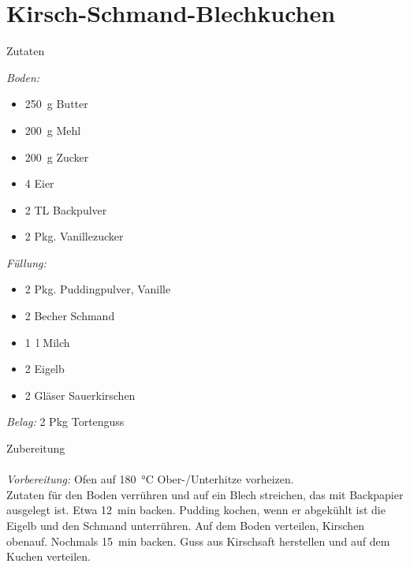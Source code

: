 \section*{Kirsch-Schmand-Blechkuchen}
\ihead{}\ohead{}
\cfoot{}
{\Large Zutaten}
\begin{multicols}{2}
\textit{Boden:}
\begin{itemize}
    \item \SI{250}{g} Butter
    \item \SI{200}{g} Mehl
    \item \SI{200}{g} Zucker
    \item \num{4} Eier
    \item \num{2} TL Backpulver
    \item \num{2} Pkg. Vanillezucker
\end{itemize}
\textit{Füllung:}
\begin{itemize}
    \item \num{2} Pkg. Puddingpulver, Vanille
    \item \num{2} Becher Schmand
    \item \SI{1}{l} Milch
    \item \num{2} Eigelb
    \item \num{2} Gläser Sauerkirschen
\end{itemize}
\textit{Belag:} \num{2} Pkg Tortenguss
\end{multicols}
\noindent
{\Large Zubereitung}\\
\\
\textit{Vorbereitung:} Ofen auf \SI{180}{\celsius} Ober-/Unterhitze vorheizen.\\
Zutaten für den Boden verrühren und auf ein Blech streichen, das mit Backpapier ausgelegt ist.
Etwa \SI{12}{min} backen.
Pudding kochen, wenn er abgekühlt ist die Eigelb und den Schmand unterrühren. 
Auf dem Boden verteilen, Kirschen obenauf.
Nochmals \SI{15}{min} backen. 
Guss aus Kirschsaft herstellen und auf dem Kuchen verteilen. 

